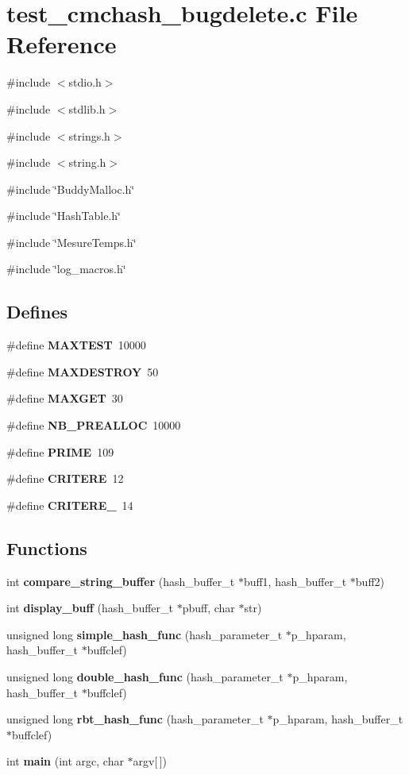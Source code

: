 \section{test\_\-cmchash\_\-bugdelete.c File Reference}
\label{test__cmchash__bugdelete_8c}
{\ttfamily \#include $<$stdio.h$>$}\par
{\ttfamily \#include $<$stdlib.h$>$}\par
{\ttfamily \#include $<$strings.h$>$}\par
{\ttfamily \#include $<$string.h$>$}\par
{\ttfamily \#include \char`\"{}BuddyMalloc.h\char`\"{}}\par
{\ttfamily \#include \char`\"{}HashTable.h\char`\"{}}\par
{\ttfamily \#include \char`\"{}MesureTemps.h\char`\"{}}\par
{\ttfamily \#include \char`\"{}log\_\-macros.h\char`\"{}}\par
\subsection*{Defines}
\begin{DoxyCompactItemize}
\item 
\#define {\bf MAXTEST}~10000
\item 
\#define {\bf MAXDESTROY}~50
\item 
\#define {\bf MAXGET}~30
\item 
\#define {\bf NB\_\-PREALLOC}~10000
\item 
\#define {\bf PRIME}~109
\item 
\#define {\bf CRITERE}~12
\item 
\#define {\bf CRITERE\_}~14
\end{DoxyCompactItemize}
\subsection*{Functions}
\begin{DoxyCompactItemize}
\item 
int {\bf compare\_\-string\_\-buffer} (hash\_\-buffer\_\-t $\ast$buff1, hash\_\-buffer\_\-t $\ast$buff2)
\item 
int {\bf display\_\-buff} (hash\_\-buffer\_\-t $\ast$pbuff, char $\ast$str)
\item 
unsigned long {\bf simple\_\-hash\_\-func} (hash\_\-parameter\_\-t $\ast$p\_\-hparam, hash\_\-buffer\_\-t $\ast$buffclef)
\item 
unsigned long {\bf double\_\-hash\_\-func} (hash\_\-parameter\_\-t $\ast$p\_\-hparam, hash\_\-buffer\_\-t $\ast$buffclef)
\item 
unsigned long {\bf rbt\_\-hash\_\-func} (hash\_\-parameter\_\-t $\ast$p\_\-hparam, hash\_\-buffer\_\-t $\ast$buffclef)
\item 
int {\bf main} (int argc, char $\ast$argv[$\,$])
\end{DoxyCompactItemize}
